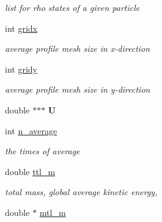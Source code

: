 \begin{CompactItemize}
\begin{CompactList}\small\item\em list for rho states of a given particle \item\end{CompactList}\item 
\hypertarget{classDiagnose_63dce0bdefd95c49730ab011321ad984}{
int \hyperlink{classDiagnose_63dce0bdefd95c49730ab011321ad984}{gridx}}
\label{classDiagnose_63dce0bdefd95c49730ab011321ad984}

\begin{CompactList}\small\item\em average profile mesh size in x-direction \item\end{CompactList}\item 
\hypertarget{classDiagnose_3cda015218278477cbbe85b6e55b4398}{
int \hyperlink{classDiagnose_3cda015218278477cbbe85b6e55b4398}{gridy}}
\label{classDiagnose_3cda015218278477cbbe85b6e55b4398}

\begin{CompactList}\small\item\em average profile mesh size in y-direction \item\end{CompactList}\item 
\hypertarget{classDiagnose_8fbc4859156ad72a70b471edd8326552}{
double $\ast$$\ast$$\ast$ \textbf{U}}
\label{classDiagnose_8fbc4859156ad72a70b471edd8326552}

\item 
\hypertarget{classDiagnose_a08ef64241663163214a68507d578e27}{
int \hyperlink{classDiagnose_a08ef64241663163214a68507d578e27}{n\_\-average}}
\label{classDiagnose_a08ef64241663163214a68507d578e27}

\begin{CompactList}\small\item\em the times of average \item\end{CompactList}\item 
double \hyperlink{classDiagnose_31e87c9b084b73a78c1e2758149800ed}{ttl\_\-m}
\begin{CompactList}\small\item\em total mass, global average kinetic energy, \item\end{CompactList}\item 
\hypertarget{classDiagnose_fb8a8b1acd170da00404455ee0e674df}{
double $\ast$ \hyperlink{classDiagnose_fb8a8b1acd170da00404455ee0e674df}{mtl\_\-m}}
\label{classDiagnose_fb8a8b1acd170da00404455ee0e674df}


\end{CompactItemize}
